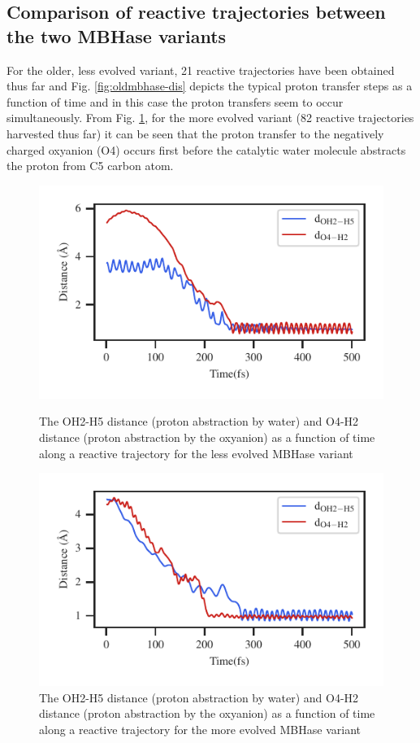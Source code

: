 \documentclass[%
preprint,
 amsmath,amssymb,
 aps,
prb,
]{revtex4-2}
\begin{document}
\subsection{Comparison of reactive trajectories between the two MBHase variants}
For the older, less evolved variant, 21 reactive trajectories have been obtained thus far and Fig. \ref{fig:oldmbhase-dis}
depicts the typical proton transfer steps as a function of time and in this case the proton transfers seem to occur 
simultaneously. From Fig. \ref{fig:newmbhase-dis}, for the more evolved variant (82 reactive trajectories harvested thus far)
it can be seen that the proton transfer to the negatively charged oxyanion (O4) occurs first before the catalytic 
water molecule abstracts the proton from C5 carbon atom.  
\begin{figure}[ht!]
\centering
\begin{minipage}[b]{.4\textwidth}
\includegraphics[scale=0.9]{figures/mbhase-diff19.pdf}
\caption{The OH2-H5 distance (proton abstraction by water) and O4-H2 distance (proton abstraction by the oxyanion)
as a function of time along a reactive trajectory for the less evolved MBHase variant}\label{fig:oldmbhase-dis}
\end{minipage}\qquad
\begin{minipage}[b]{.4\textwidth}
\includegraphics[scale=0.9]{figures/new-mbhase-diff80.pdf}
\caption{The OH2-H5 distance (proton abstraction by water) and O4-H2 distance (proton abstraction by the oxyanion)
as a function of time along a reactive trajectory for the more evolved MBHase variant}\label{fig:newmbhase-dis}
\end{minipage}
\end{figure}
\end{document}
